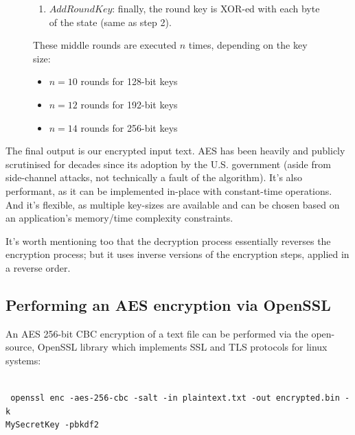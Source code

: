 \begin{figure}[htbp]
\begin{minipage}{0.5\textwidth}
\begin{enumerate}
            \item $AddRoundKey$: finally, the round key is XOR-ed with each byte of the state (same as step 2).
        \end{enumerate}
        \vspace{0.5em}
        These middle rounds are executed $n$ times, depending on the key size:
        \begin{itemize}
            \item $n=10$ rounds for 128-bit keys
            \item $n=12$ rounds for 192-bit keys
            \item $n=14$ rounds for 256-bit keys
        \end{itemize}

    \end{minipage}
\end{figure}
The final output is our encrypted input text. AES has been heavily and publicly scrutinised for decades since its adoption by the U.S. government \cite{FIPS197} (aside from side-channel attacks, not technically a fault of the algorithm). It's also performant, as it can be implemented in-place with constant-time operations. And it's flexible, as multiple key-sizes are available and can be chosen based on an application's memory/time complexity constraints.

It's worth mentioning too that the decryption process essentially reverses the encryption process; but it uses inverse versions of the encryption steps, applied in a reverse order.

\subsection{Performing an AES encryption via OpenSSL}
An AES 256-bit CBC encryption of a text file can be performed via the open-source, OpenSSL library which implements SSL and TLS protocols for linux systems:

\ \\
\texttt{
openssl enc -aes-256-cbc -salt -in plaintext.txt -out encrypted.bin -k \\ MySecretKey -pbkdf2
}
\ \\

